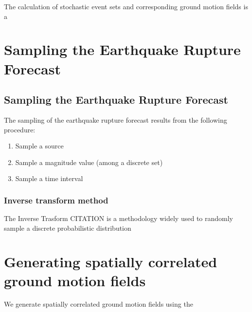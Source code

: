 The calculation of stochastic event sets and corresponding ground motion fields
is a 
%
\section{Sampling the Earthquake Rupture Forecast}
%
\subsection{Sampling the Earthquake Rupture Forecast}
The sampling of the earthquake rupture forecast results from the following 
procedure:
\begin{enumerate} 
\item Sample a source
\item Sample a magnitude value (among a discrete set)
\item Sample a time interval  
\end{enumerate} 
%
\subsubsection{Inverse transform method}
The Inverse Trasform CITATION is a methodology widely used to randomly sample 
a discrete probabilistic distribution 
%
\section{Generating spatially correlated ground motion fields} 
We generate spatially correlated ground motion fields using the 
